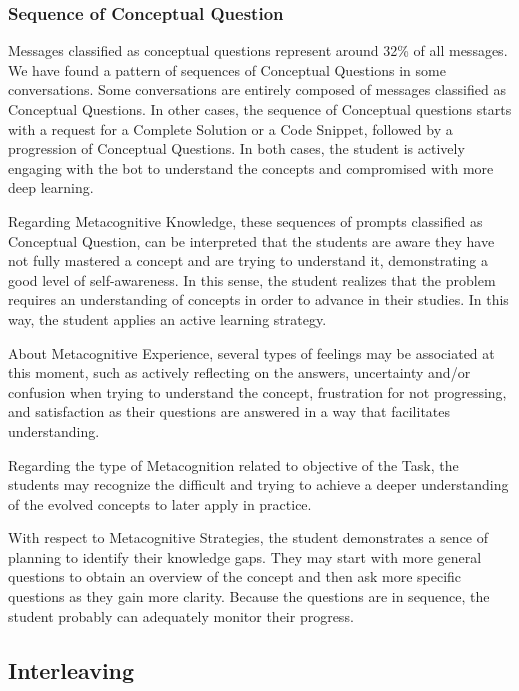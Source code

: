 \documentclass[a4paper,twoside]{article}
\begin{document}
\subsubsection*{Sequence of Conceptual Question}

Messages classified as conceptual questions represent around 32\% of all
messages. We have found a pattern of sequences of Conceptual Questions in some
conversations. Some conversations are entirely composed of messages classified
as Conceptual Questions. In other cases, the sequence of Conceptual questions
starts with a request for a Complete Solution or a Code Snippet, followed by
a progression of Conceptual Questions. In both cases, the student is actively
engaging with the bot to understand the concepts and compromised with more
deep learning.

Regarding Metacognitive Knowledge, these sequences of prompts classified as
Conceptual Question, can be interpreted that the students are aware they have
not fully mastered a concept and are trying to understand it, demonstrating a
good level of self-awareness. In this sense, the student realizes that the
problem requires an understanding of concepts in order to advance in their
studies. In this way, the student applies an active learning strategy.

About Metacognitive Experience, several types of feelings may be associated at
this moment, such as actively reflecting on the answers, uncertainty and/or
confusion when trying to understand the concept, frustration for not
progressing, and satisfaction as their questions are answered in a way that
facilitates understanding.

Regarding the type of Metacognition related to objective of the Task, the
students may recognize the difficult and trying to achieve a deeper
understanding of the evolved concepts to later apply in practice.

With respect to Metacognitive Strategies, the student demonstrates a sence of
planning to identify their knowledge gaps. They may start with more general
questions to obtain an overview of the concept and then ask more specific
questions as they gain more clarity. Because the questions are in sequence, the
student probably can adequately monitor their progress.

\subsection*{Interleaving}
\end{document}
